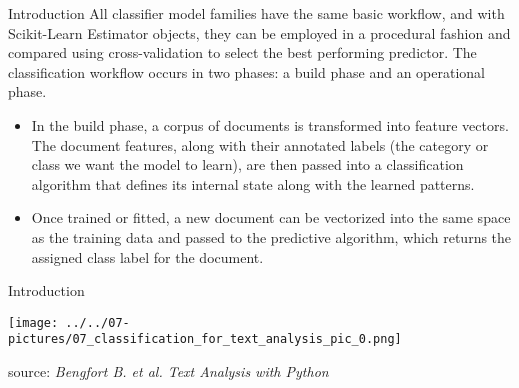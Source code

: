 \documentclass[11pt]{beamer}
\begin{document}
\begin{frame}{Introduction}
All classifier model families have the same basic workflow, and with Scikit-Learn Estimator objects, they can be employed in a procedural fashion and compared using cross-validation to select the best performing predictor.
The classification workflow occurs in two phases: a build phase and an operational phase.
	\begin{itemize}
		\item In the build phase, a corpus of documents is transformed into feature vectors. The document features, along with their annotated labels (the category or class we want the model to learn), are then passed into a classification algorithm that defines its internal state along with the learned patterns. 
		\item Once trained or fitted, a new document can be vectorized into the same space as the training data and passed to the predictive algorithm, which returns the assigned class label for the document.
	\end{itemize}
\end{frame}
\begin{frame}{Introduction}
	\begin{center}
	\texttt{[image: ../../07-pictures/07\_classification\_for\_text\_analysis\_pic\_0.png]}
	\end{center}
	\footnotesize{source: \textit{Bengfort B. et al. Text Analysis with Python}}
\end{frame}
\end{document}
